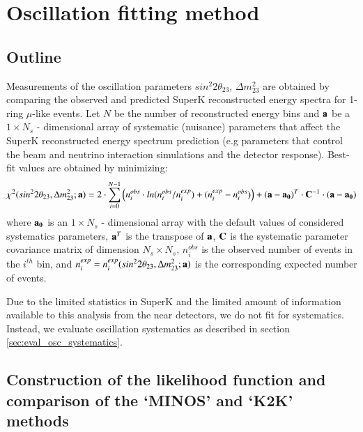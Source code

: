 \clearpage

\section {Oscillation fitting method} 
\label{sec:fitting}

\subsection {Outline}

Measurements of the oscillation parameters $sin^{2}2\theta_{23}$, $\Delta m^{2}_{23}$
are obtained by comparing the observed and predicted SuperK reconstructed energy spectra
for 1-ring $\mu$-like events.
Let $N$ be the number of reconstructed energy bins and
${\bf a}$ be a $1 \times N_{s}$ - dimensional array of systematic (nuisance) 
parameters that affect the SuperK reconstructed energy spectrum prediction (e.g
parameters that control the beam and neutrino interaction simulations and 
the detector response).
Best-fit values are obtained by minimizing: 
\begin{equation}
\displaystyle
\chi^{2} (sin^{2}2\theta_{23},\Delta m^{2}_{23}; {\bf a}) = 
  2 \cdot \sum_{i=0}^{N-1} 
   \Big( 
     n^{obs}_{i} \cdot ln(n^{obs}_{i}/n^{exp}_{i}) +
     (n^{exp}_{i}-n^{obs}_{i}) 
   \Big) +
   ({\bf a}-{\bf a_{0}})^{T} \cdot {\bf C}^{-1} \cdot ({\bf a}-{\bf a_{0}})
\label{eq:chisquare}
\end{equation}
where
${\bf a_{0}}$ is an $1 \times N_{s}$ - dimensional array with the default values of 
considered systematics parameters, ${\bf a}^{T}$ is the transpose of ${\bf a}$,
${\bf C}$ is the systematic parameter covariance matrix of dimension $N_{s} \times N_{s}$,
$n^{obs}_{i}$ is the observed number of events in the $i^{th}$ bin, and
$n^{exp}_{i} = n^{exp}_{i}(sin^{2}2\theta_{23},\Delta m^{2}_{23}; {\bf a})$ 
is the corresponding expected number of events.

Due to the limited statistics in SuperK 
and the limited amount of information available to this analysis from the near detectors,
we do not fit for systematics.  Instead, we evaluate oscillation systematics as described
in section \ref{sec:eval_osc_systematics}.



%
%
%
%

\subsection {Construction of the likelihood function and comparison of the `MINOS' and `K2K' methods }
\label{sec:K2K_MINOS_fit_comparison}

